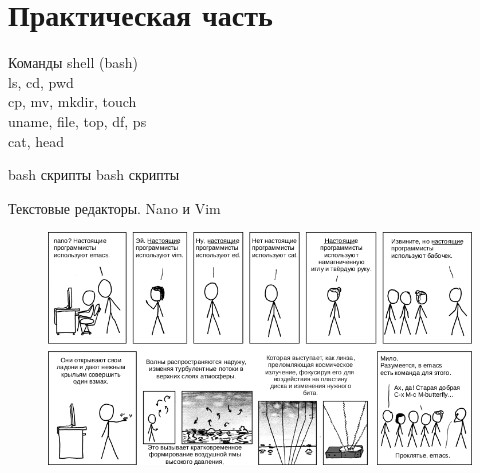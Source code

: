 \documentclass[newPxFont]{beamer}
\begin{document}


\section{Практическая часть}




\begin{frame}[c]{Команды shell (bash)}
\\
{\huge ls, cd, pwd} \\
{\huge cp, mv, mkdir, touch} \\
{\huge uname, file, top, df, ps} \\
{\huge cat, head} \\
\end{frame}


\begin{frame}[c]{bash скрипты}
bash скрипты
\end{frame}

\begin{frame}[c]{Текстовые редакторы. Nano и Vim}
	\begin{figure}
		\centerline{\includegraphics[width=1.15\linewidth]{images/real_programmers.png}}
	\end{figure}
\end{frame}
\end{document}

